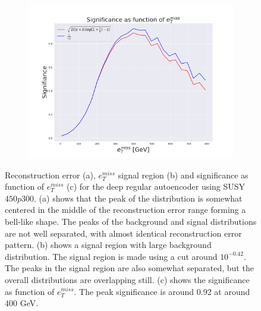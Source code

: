 \begin{figure}[H]
    \hfill  
    \begin{subfigure}{.40\textwidth}
        \includegraphics[width=\textwidth]{Figures/VAE_testing/small/2lep/significance_etmiss_450p0p0300_-0.4242401749818261.pdf}
        \caption{}
        \label{fig:VAE_2lep_small_signi_450_3}
    \end{subfigure}
    \hfill      
    \caption[2lep shallow network | $450p300$ | VAE | 3]{Reconstruction error (a), $e_T^{miss}$ signal region (b) and significance as function of 
    $e_T^{miss}$ (c) for the deep regular autoencoder using SUSY $450p300$. 
    (a) shows that the peak of the distribution is somewhat centered in the middle 
    of the reconstruction error range forming a bell-like shape. The peaks of the background and signal 
    distributions are not well separated, with almost identical reconstruction error pattern. (b) 
    shows a signal region with large background distribution. The signal region is made using a cut around
    $10^{-0.42}$. The peaks in the signal region are also somewhat 
    separated, but the overall distributions are overlapping still. 
    (c) shows the significance as function of $e_T^{miss}$. 
    The peak significance is around 0.92 at around 400 GeV.}
    \label{fig:VAE_2lep_small_rec_sig_signi_450_3}
\end{figure}


